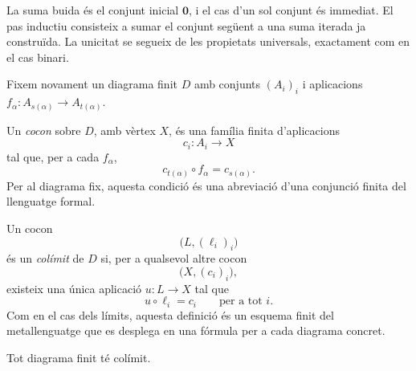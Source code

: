 \begin{prova}
La suma buida és el conjunt inicial \(\mathbf0\), i el cas d'un sol conjunt és immediat. El pas inductiu consisteix a sumar el conjunt següent a una suma iterada ja construïda. La unicitat se segueix de les propietats universals, exactament com en el cas binari.
\end{prova}

Fixem novament un diagrama finit \(D\) amb conjunts \((A_i)_i\) i aplicacions \(f_\alpha:A_{s(\alpha)}\to A_{t(\alpha)}\).

\begin{definicio}[Cocon]\label{def:cocon}
Un \emph{cocon} sobre \(D\), amb vèrtex \(X\), és una família finita d'aplicacions
\[
c_i:A_i\to X
\]
tal que, per a cada \(f_\alpha\),
\[
c_{t(\alpha)}\circ f_\alpha=c_{s(\alpha)}.
\]
Per al diagrama fix, aquesta condició és una abreviació d'una conjunció finita del llenguatge formal.
\end{definicio}

\begin{definicio}[Colímit]\label{def:colimit}
Un cocon
\[
\bigl(L,(\ell_i)_i\bigr)
\]
és un \emph{colímit} de \(D\) si, per a qualsevol altre cocon
\[
\bigl(X,(c_i)_i\bigr),
\]
existeix una única aplicació \(u:L\to X\) tal que
\[
u\circ\ell_i=c_i
\qquad\text{per a tot }i.
\]
Com en el cas dels límits, aquesta definició és un esquema finit del metallenguatge que es desplega en una fórmula per a cada diagrama concret.
\end{definicio}

\begin{teorema}\label{teo:colimits-finits}
Tot diagrama finit té colímit.
\end{teorema}

